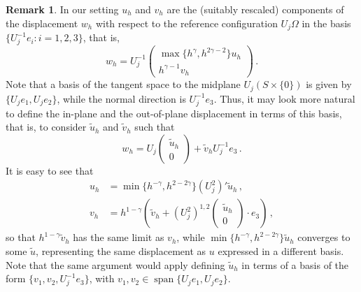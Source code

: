 \documentclass{article}
\theoremstyle{plain}
\theoremstyle{plain}
\theoremstyle{plain}
\theoremstyle{plain}
\theoremstyle{plain}
\theoremstyle{definition}
\newtheorem{remark}[teo]{Remark}
\theoremstyle{definition}
\DeclareMathOperator{\vspan}{span}
\begin{document}
\begin{remark}\label{remark:basis_u_v}
    In our setting $u_h$ and $v_h$ are the (suitably rescaled) components of the displacement $w_h$ with respect to the reference configuration $U_j \Omega$ in the basis $\{U_j^{-1} e_i \colon i = 1, 2, 3\}$, that is,
    \begin{equation}
        w_h = U_j^{-1}\begin{pmatrix}
            \max\{h^\gamma, h^{2 \gamma - 2}\} u_h \\
            h^{\gamma - 1} v_h
        \end{pmatrix} \,.
    \end{equation}
    Note that a basis of the tangent space to the midplane $U_j(S \times \{0\})$ is given by $\{U_j e_1, U_je_2\}$, while the normal direction is $U_j^{-1}e_3$. Thus, it may look more natural to define the in-plane and the out-of-plane displacement in terms of this basis, that is, to consider $\tilde u_h$ and $\tilde v_h$ such that
    \begin{equation}
        w_h = U_j \begin{pmatrix}
            \tilde u_h \\ 0
        \end{pmatrix} + \tilde v_h U_j^{-1} e_3 \,.
    \end{equation} 
    It is easy to see that
    \begin{align}
        u_h & = \min\{h^{-\gamma}, h^{2 - 2 \gamma}\} (U_j^2)' \tilde u_h \,,\\
        v_h & = h^{1 - \gamma} \left( \tilde v_h + (U_j^2)^{1, 2} \begin{pmatrix}
            \tilde u_h \\ 0
        \end{pmatrix} \cdot e_3\right) \,,
    \end{align}
    so that $h^{1-\gamma} \tilde v_h$ has the same limit as $v_h$, while $\min\{h^{-\gamma}, h^{2-2\gamma}\} \tilde u_h$ converges to some $\tilde u$, representing the same displacement as $u$ expressed in a different basis.
    Note that the same argument would apply defining $ \tilde u_{h} $ in terms of a basis of the form $ \{v_{1}, v_{2}, U_{j}^{-1}e_{3}\} $, with $ v_{1}, v_{2} \in \vspan \{U_{j}e_{1}, U_{j}e_{2}\}$.
\end{remark}
\end{document}
